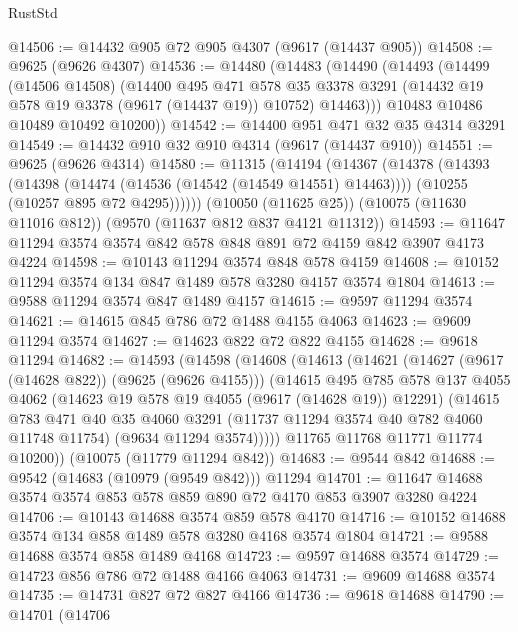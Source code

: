 \begin{lexlean}{RustStd}
\begin{coremodule}
{\begin{coremodule}
{{{{{{{{{{{{{{{{{{{{{{{{{{{{{{{{{@14506 := @14432 @905 @72 @905 @4307 (@9617 (@14437 @905))
@14508 := @9625 (@9626 @4307)
@14536 := @14480
    (@14483
      (@14490
        (@14493
          (@14499
            (@14506 @14508)
            (@14400
              @495
              @471
              @578
              @35
              @3378
              @3291
              (@14432 @19 @578 @19 @3378 (@9617 (@14437 @19)) @10752)
              @14463)))
        @10483
        @10486
        @10489
        @10492
        @10200))
@14542 := @14400 @951 @471 @32 @35 @4314 @3291
@14549 := @14432 @910 @32 @910 @4314 (@9617 (@14437 @910))
@14551 := @9625 (@9626 @4314)
@14580 := @11315
    (@14194
      (@14367
        (@14378
          (@14393
            (@14398 (@14474 (@14536 (@14542 (@14549 @14551) @14463))))
            (@10255 (@10257 @895 @72 @4295))))))
    (@10050 (@11625 @25))
    (@10075 (@11630 @11016 @812))
    (@9570 (@11637 @812 @837 @4121 @11312))
@14593 := @11647 @11294 @3574 @3574 @842 @578 @848 @891 @72 @4159 @842 @3907 @4173 @4224
@14598 := @10143 @11294 @3574 @848 @578 @4159
@14608 := @10152 @11294 @3574 @134 @847 @1489 @578 @3280 @4157 @3574 @1804
@14613 := @9588 @11294 @3574 @847 @1489 @4157
@14615 := @9597 @11294 @3574
@14621 := @14615 @845 @786 @72 @1488 @4155 @4063
@14623 := @9609 @11294 @3574
@14627 := @14623 @822 @72 @822 @4155
@14628 := @9618 @11294
@14682 := @14593
    (@14598
      (@14608
        (@14613
          (@14621
            (@14627 (@9617 (@14628 @822)) (@9625 (@9626 @4155)))
            (@14615
              @495
              @785
              @578
              @137
              @4055
              @4062
              (@14623 @19 @578 @19 @4055 (@9617 (@14628 @19)) @12291)
              (@14615
                @783
                @471
                @40
                @35
                @4060
                @3291
                (@11737 @11294 @3574 @40 @782 @4060 @11748 @11754)
                (@9634 @11294 @3574)))))
        @11765
        @11768
        @11771
        @11774
        @10200))
    (@10075 (@11779 @11294 @842))
@14683 := @9544 @842
@14688 := @9542 (@14683 (@10979 (@9549 @842))) @11294
@14701 := @11647 @14688 @3574 @3574 @853 @578 @859 @890 @72 @4170 @853 @3907 @3280 @4224
@14706 := @10143 @14688 @3574 @859 @578 @4170
@14716 := @10152 @14688 @3574 @134 @858 @1489 @578 @3280 @4168 @3574 @1804
@14721 := @9588 @14688 @3574 @858 @1489 @4168
@14723 := @9597 @14688 @3574
@14729 := @14723 @856 @786 @72 @1488 @4166 @4063
@14731 := @9609 @14688 @3574
@14735 := @14731 @827 @72 @827 @4166
@14736 := @9618 @14688
@14790 := @14701
    (@14706
}}}}}}}}}}}}}}}}}}}}}}}}}}}}}}}}}
\end{coremodule}}
\end{coremodule}
\end{lexlean}
